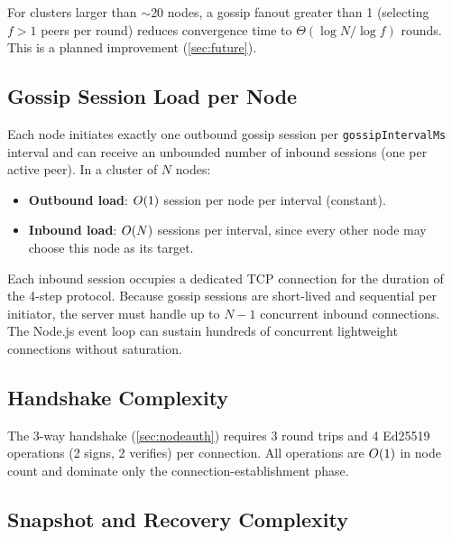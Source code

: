\begin{remark}
For clusters larger than $\sim$20 nodes, a gossip fanout greater than 1
(selecting $f > 1$ peers per round) reduces convergence time to
$\Theta(\log N / \log f)$ rounds. This is a planned improvement
(\cref{sec:future}).
\end{remark}

\subsection{Gossip Session Load per Node}

Each node initiates exactly one outbound gossip session per
\texttt{gossipIntervalMs} interval and can receive an unbounded number of
inbound sessions (one per active peer). In a cluster of $N$ nodes:

\begin{itemize}[leftmargin=1.5em]
  \item \textbf{Outbound load}: $O\!\left(1\right)$ session per node per interval (constant).
  \item \textbf{Inbound load}: $O\!\left(N\right)$ sessions per interval, since every
        other node may choose this node as its target.
\end{itemize}

Each inbound session occupies a dedicated TCP connection for the duration of
the 4-step protocol. Because gossip sessions are short-lived and sequential per
initiator, the server must handle up to $N-1$ concurrent inbound connections.
The Node.js event loop can sustain hundreds of concurrent lightweight connections
without saturation.

\subsection{Handshake Complexity}

The 3-way handshake (\cref{sec:nodeauth}) requires 3 round trips and 4
Ed25519 operations (2 signs, 2 verifies) per connection. All operations are
$O\!\left(1\right)$ in node count and dominate only the connection-establishment phase.

\subsection{Snapshot and Recovery Complexity}


